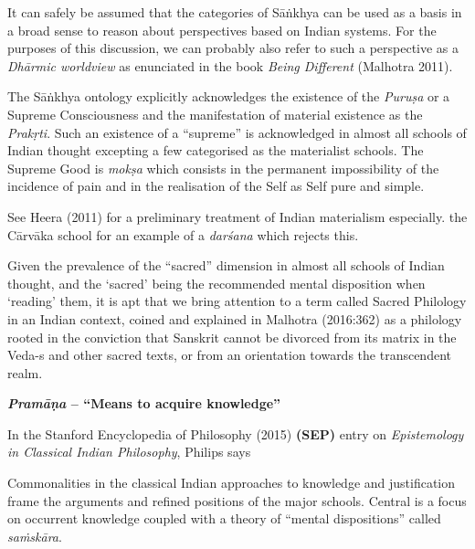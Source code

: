 It can safely be assumed that the categories of Sāṅkhya can be used as a basis in a broad sense to reason about perspectives based on Indian systems. For the purposes of this discussion, we can probably also refer to such a perspective as a {\sl Dhārmic worldview} as enunciated in the book {\sl Being Different} (Malhotra 2011).

The Sāṅkhya ontology explicitly acknowledges the existence of the {\sl Puruṣa} or a Supreme Consciousness and the manifestation of material existence as the {\sl Prakṛti}. Such an existence of a ``supreme'' is acknowledged in almost all schools of Indian thought excepting a few categorised as the materialist schools. The Supreme Good is {{\sl mokṣa}\relax} which consists in the permanent impossibility of the incidence of pain and in the realisation of the Self as Self pure and simple.

See Heera (2011) for a preliminary treatment of Indian materialism especially. the Cārvāka school for an example of a {\sl darśana} which rejects this.

Given the prevalence of the ``sacred'' dimension in almost all schools of Indian thought, and the `sacred' being the recommended mental disposition when `reading' them, it is apt that  we bring attention to a term called Sacred Philology in an Indian context, coined and explained in Malhotra  (2016:362) as a philology rooted in the conviction that Sanskrit cannot be divorced from its matrix in the Veda-s and other sacred texts, or from an orientation towards the transcendent realm.

{\bf {\sl\bfseries Pramāṇa}  -- ``Means to acquire knowledge''}

In the Stanford Encyclopedia of Philosophy (2015) {\bf(SEP)} entry on {\sl Epistemology in Classical Indian Philosophy}, Philips says
\begin{myquote}
Commonalities in the classical Indian approaches to knowledge and justification frame the arguments and refined positions of the major schools. Central is a focus on occurrent knowledge coupled with a theory of ``mental dispositions'' called {\sl saṁskāra}.
\end{myquote}

